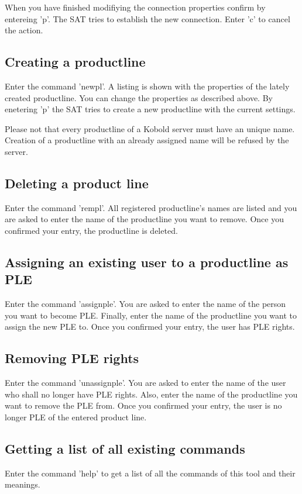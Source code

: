 When you have finished modifiying the connection properties confirm by entereing 'p'. The SAT 
tries to establish the new connection. Enter 'c' to cancel the action.

\subsection{Creating a productline}
Enter the command 'newpl'. A listing is shown with the properties of the lately created
productline. You can change the properties as described above. By enetering 'p' the SAT
tries to create a new productline with the current settings. \par

Please not that every productline of a Kobold server must have an unique name. Creation
of a productline with an already assigned name will be refused by the server.

\subsection{Deleting a product line}
Enter the command 'rempl'. All registered productline's names are listed and you are 
asked to enter the name of the productline you want to remove. Once you confirmed your 
entry, the productline is deleted.

\subsection{Assigning an existing user to a productline as PLE}
Enter the command 'assignple'. You are asked to enter the name of the person you want
to become PLE. Finally, enter the name of the productline you want to assign the new 
PLE to. Once you confirmed your entry, the user has PLE rights.

\subsection{Removing PLE rights}
Enter the command 'unassignple'. You are asked to enter the name of the user who shall 
no longer have PLE rights. Also, enter the name of the productline you want to
remove the PLE from. Once you confirmed your entry, the user is no longer PLE of
the entered product line.

\subsection{Getting a list of all existing commands}
Enter the command 'help' to get a list of all the commands of this tool and
their meanings.

